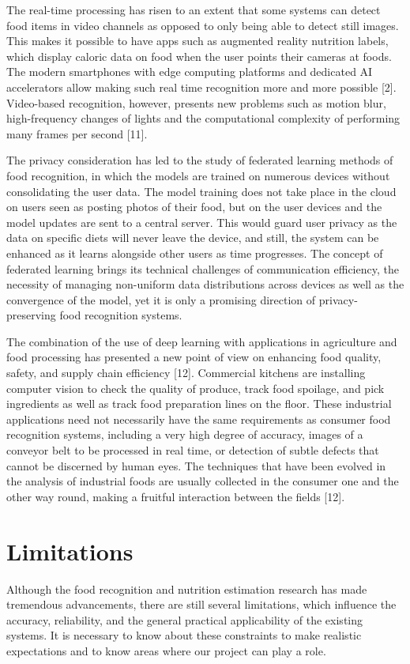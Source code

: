 \documentclass[12pt, openany]{report}
\begin{document}
The real-time processing has risen to an extent that some systems can detect food items in video channels as opposed to only being able to detect still images. This makes it possible to have apps such as augmented reality nutrition labels, which display caloric data on food when the user points their cameras at foods. The modern smartphones with edge computing platforms and dedicated AI accelerators allow making such real time recognition more and more possible [2]. Video-based recognition, however, presents new problems such as motion blur, high-frequency changes of lights and the computational complexity of performing many frames per second [11].

The privacy consideration has led to the study of federated learning methods of food recognition, in which the models are trained on numerous devices without consolidating the user data. The model training does not take place in the cloud on users seen as posting photos of their food, but on the user devices and the model updates are sent to a central server. This would guard user privacy as the data on specific diets will never leave the device, and still, the system can be enhanced as it learns alongside other users as time progresses. The concept of federated learning brings its technical challenges of communication efficiency, the necessity of managing non-uniform data distributions across devices as well as the convergence of the model, yet it is only a promising direction of privacy-preserving food recognition systems.

The combination of the use of deep learning with applications in agriculture and food processing has presented a new point of view on enhancing food quality, safety, and supply chain efficiency [12]. Commercial kitchens are installing computer vision to check the quality of produce, track food spoilage, and pick ingredients as well as track food preparation lines on the floor. These industrial applications need not necessarily have the same requirements as consumer food recognition systems, including a very high degree of accuracy, images of a conveyor belt to be processed in real time, or detection of subtle defects that cannot be discerned by human eyes. The techniques that have been evolved in the analysis of industrial foods are usually collected in the consumer one and the other way round, making a fruitful interaction between the fields [12].

\section{Limitations}
Although the food recognition and nutrition estimation research has made tremendous advancements, there are still several limitations, which influence the accuracy, reliability, and the general practical applicability of the existing systems. It is necessary to know about these constraints to make realistic expectations and to know areas where our project can play a role.
\end{document}
